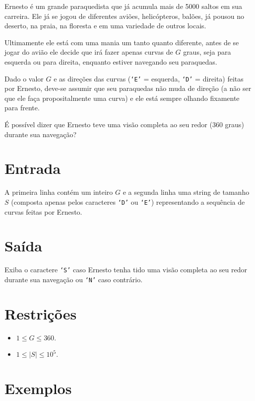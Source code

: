 Ernesto é um grande paraquedista que já acumula mais de 5000 saltos em sua carreira. Ele já se jogou de diferentes aviões, helicópteros, balões, já pousou no deserto, na praia, na floresta e em uma variedade de outros locais.

Ultimamente ele está com uma mania um tanto quanto diferente, antes de se jogar do avião ele decide que irá fazer apenas curvas de $G$ graus, seja para esquerda ou para direita, enquanto estiver navegando seu paraquedas.

Dado o valor $G$ e as direções das curvas (\texttt{`E'} = esquerda, \texttt{`D'} = direita) feitas por Ernesto, deve-se assumir que seu paraquedas não muda de direção (a não ser que ele faça propositalmente uma curva) e ele está sempre olhando fixamente para frente.

É possível dizer que Ernesto teve uma visão completa ao seu redor (360 graus) durante sua navegação?

\section*{Entrada}

A primeira linha contém um inteiro $G$ e a segunda linha uma string de tamanho $S$ (composta apenas pelos caracteres \texttt{`D'} ou \texttt{`E'}) representando a sequência de curvas feitas por Ernesto.

\section*{Saída}

Exiba o caractere \texttt{`S'} caso Ernesto tenha tido uma visão completa ao seu redor durante sua navegação ou \texttt{`N'} caso contrário.

\section*{Restrições}

\begin{itemize}
\item $1 \leq G \leq 360$.
\item $1 \leq |S| \leq 10^5$.
\end{itemize}

\section*{Exemplos}

\exemplo
